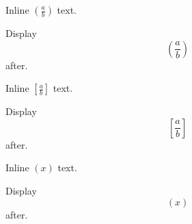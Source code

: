 \documentclass[12pt]{article}
\begin{document}
Inline $\left( \frac{a}{b} \right)$ text.

Display \[ \left( \frac{a}{b} \right) \] after.

Inline $\left[ \frac{a}{b} \right]$ text.

Display \[ \left[ \frac{a}{b} \right] \] after.

Inline $\left( x \right)$ text.

Display \[ \left( x \right) \] after.
\end{document}
